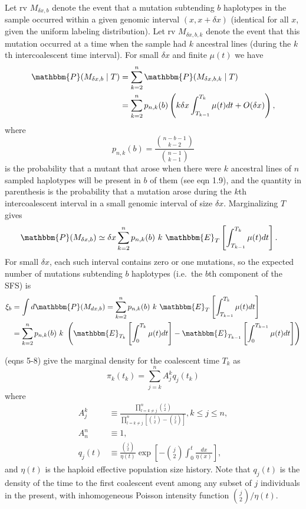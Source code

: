 \documentclass[11pt]{article}
\begin{document}
Let rv $M_{\delta x, b}$ denote the event that a mutation subtending $b$ haplotypes in the sample occurred within a given genomic interval $(x,x+\delta x)$ (identical for all $x$, given the uniform labeling distribution).
Let rv $M_{\delta x, b, k}$ denote the event that this mutation occurred at a time when the sample had $k$ ancestral lines (during the $k$th intercoalescent time interval).
For small $\delta x$ and finite $\mu(t)$ we have
\begin{align*}
\mathbbm{P}(M_{\delta x, b}\mid T) &= \sum_{k=2}^n \mathbbm{P}(M_{\delta x, b, k}\mid T)\\
&= \sum_{k=2}^n p_{n,k}(b)\left(k\delta x\int_{T_{k-1}}^{T_k}\mu(t)dt + O(\delta x)\right),
\end{align*}
where
\begin{equation}
\label{eqn:p}
p_{n,k}(b) = \frac{\binom{n-b-1}{k-2}}{\binom{n-1}{k-1}}
\end{equation}
is the probability that a mutant that arose when there were $k$ ancestral lines of $n$ sampled haplotypes will be present in $b$ of them (see \cite{Griffiths1998-qf} eqn 1.9), and the quantity in parenthesis is the probability that a mutation arose during the $k$th intercoalescent interval in a small genomic interval of size $\delta x$.
Marginalizing $T$ gives
\begin{align*}
\mathbbm{P}(M_{\delta x, b}) &\simeq \delta x\sum_{k=2}^n p_{n,k}(b)\ k\ \mathbbm{E}_T\left[\int_{T_{k-1}}^{T_k}\mu(t)dt\right].
\end{align*}
For small $\delta x$, each such interval contains zero or one mutations, so the expected number of mutations subtending $b$ haplotypes (i.e.\ the $b$th component of the SFS) is
\begin{align}
\label{eqn:xi}
\xi_b &= \int d\mathbbm{P}(M_{dx, b}) = \sum_{k=2}^n p_{n,k}(b)\ k\ \mathbbm{E}_T\left[\int_{T_{k-1}}^{T_k}\mu(t)dt\right]\nonumber\\
&= \sum_{k=2}^n p_{n,k}(b)\ k\ \left(\mathbbm{E}_{T_k}\left[\int_0^{T_k}\mu(t)dt\right] - \mathbbm{E}_{T_{k-1}}\left[\int_0^{T_{k-1}}\mu(t)dt\right]\right)
\end{align}

\cite{Polanski2003-kg} (eqns 5-8) give the marginal density for the coalescent time $T_k$ as
\begin{equation}
\label{eqn:pi}
\pi_k(t_k) = \sum_{j=k}^n A_j^k q_j(t_k)
\end{equation}
where
\begin{align*}
A_j^k &\equiv \frac{\prod_{l=k\ne j}^{n}\binom{l}{2}}{\prod_{l=k\ne j}^{n}\left[\binom{l}{2}-\binom{j}{2}\right]}, k\le j\le n,\\
A_n^n &\equiv 1,\\
q_j(t) &\equiv \frac{\binom{j}{2}}{\eta(t)}\exp\left[-\binom{j}{2}\int_0^t\frac{dx}{\eta(x)}\right],
\end{align*}
and $\eta(t)$ is the haploid effective population size history.
Note that $q_j(t)$ is the density of the time to the first coalescent event among any subset of $j$ individuals in the present, with inhomogeneous Poisson intensity function $\binom{j}{2}/\eta(t)$.
\end{document}
